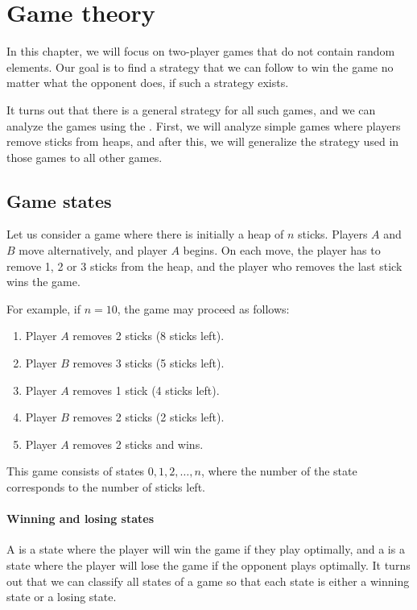 \chapter{Game theory}

In this chapter, we will focus on two-player
games that do not contain random elements.
Our goal is to find a strategy that we can
follow to win the game
no matter what the opponent does,
if such a strategy exists.

It turns out that there is a general strategy
for all such games,
and we can analyze the games using the .
First, we will analyze simple games where
players remove sticks from heaps,
and after this, we will generalize the strategy
used in those games to all other games.

\section{Game states}

Let us consider a game where there is initially
a heap of $n$ sticks.
Players $A$ and $B$ move alternatively,
and player $A$ begins.
On each move, the player has to remove
1, 2 or 3 sticks from the heap,
and the player who removes the last stick wins the game.

For example, if $n=10$, the game may proceed as follows:
\begin{enumerate}[noitemsep]
\item Player $A$ removes 2 sticks (8 sticks left).
\item Player $B$ removes 3 sticks (5 sticks left).
\item Player $A$ removes 1 stick (4 sticks left).
\item Player $B$ removes 2 sticks (2 sticks left).
\item Player $A$ removes 2 sticks and wins.
\end{enumerate}

This game consists of states $0,1,2,\ldots,n$,
where the number of the state corresponds to
the number of sticks left.

\subsubsection{Winning and losing states}


A  is a state where
the player will win the game if they
play optimally,
and a  is a state
where the player will lose the game if the
opponent plays optimally.
It turns out that we can classify all states
of a game so that each state is either
a winning state or a losing state.

